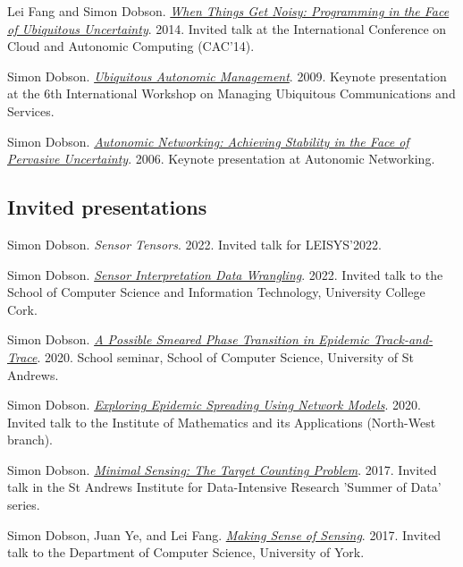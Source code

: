 \documentclass[11pt]{article}
\begin{document}
\label{org0aa08bf}Lei Fang and Simon Dobson.  \emph{\href{https://simondobson.org/softcopy/when-things-get-noisy-14.pdf}{When Things Get Noisy: Programming in the Face of Ubiquitous Uncertainty}}. 2014. Invited talk at the International Conference on Cloud and Autonomic Computing (CAC’14).

\label{orgfc9f735}Simon Dobson.  \emph{\href{https://simondobson.org/softcopy/mucs-keynote.pdf}{Ubiquitous Autonomic Management}}. 2009. Keynote presentation at the 6th International Workshop on Managing Ubiquitous Communications and Services.

\label{orgfc55c0d}Simon Dobson.  \emph{\href{https://simondobson.org/softcopy/an-talk-06.pdf}{Autonomic Networking: Achieving Stability in the Face of Pervasive Uncertainty}}. 2006. Keynote presentation at Autonomic Networking.

\subsection{Invited presentations}
\label{sec:org46e2125}

\label{org6d4d104}Simon Dobson.  \emph{Sensor Tensors}. 2022. Invited talk for LEISYS’2022.

\label{org2c5acd6}Simon Dobson.  \emph{\href{https://simondobson.org/softcopy/sensor-placement-cork-22.pdf}{Sensor Interpretation Data Wrangling}}. 2022. Invited talk to the School of Computer Science and Information Technology, University College Cork.

\label{org73f3690}Simon Dobson.  \emph{\href{https://simondobson.org/softcopy/smeared-phase-transition.pdf}{A Possible Smeared Phase Transition in Epidemic Track-and-Trace}}. 2020. School seminar, School of Computer Science, University of St Andrews.

\label{org215bb6d}Simon Dobson.  \emph{\href{https://simondobson.org/softcopy/exploring-epidemic-spreading.pdf}{Exploring Epidemic Spreading Using Network Models}}. 2020. Invited talk to the Institute of Mathematics and its Applications (North-West branch).

\label{org27e8302}Simon Dobson.  \emph{\href{https://simondobson.org/softcopy/minimal-sensing-idir17.pdf}{Minimal Sensing: The Target Counting Problem}}. 2017. Invited talk in the St Andrews Institute for Data-Intensive Research ’Summer of Data’ series.

\label{org19fb16d}Simon Dobson, Juan Ye, and Lei Fang.  \emph{\href{https://simondobson.org/softcopy/making-sense-of-sensing.pdf}{Making Sense of Sensing}}. 2017. Invited talk to the Department of Computer Science, University of York.
\end{document}
